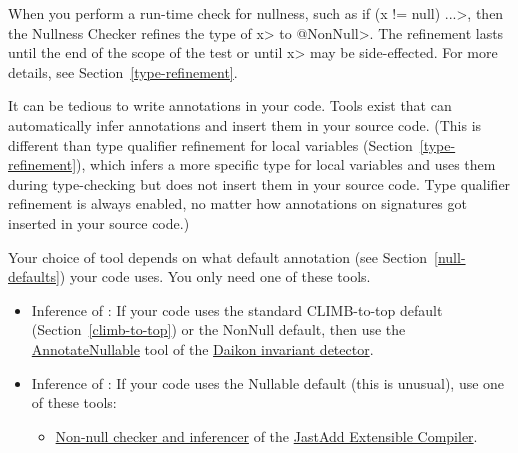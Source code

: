 
When you perform a run-time check for nullness, such as \<if (x != null)
...>, then the Nullness Checker refines the type of \<x> to
\<@NonNull>.  The refinement lasts until the end of the scope of the test
or until \<x> may be side-effected.  For more details, see
Section~\ref{type-refinement}.



It can be tedious to write annotations in your code.  Tools exist that
can automatically infer annotations and insert them in your source code.
(This is different than type qualifier refinement for local variables
(Section~\ref{type-refinement}), which infers a more specific type for
local variables and uses them during type-checking but does not insert them
in your source code.  Type qualifier refinement is always enabled, no
matter how annotations on signatures got inserted in your source code.)

Your choice of tool depends on what default annotation (see
Section~\ref{null-defaults}) your code uses.  You only need one of these tools.

\begin{itemize}

\item
  Inference of :
  If your code uses the standard CLIMB-to-top default (Section~\ref{climb-to-top}) or
  the NonNull default, then use the
  \href{https://plse.cs.washington.edu/daikon/download/doc/daikon.html#AnnotateNullable}{AnnotateNullable}
  tool of the \href{https://plse.cs.washington.edu/daikon/}{Daikon invariant
    detector}.

\item
  Inference of :
  If your code uses the Nullable default (this is unusual), use one of these tools:
\begin{itemize}
\item
  \href{https://jastadd.cs.lth.se/jastadd-tutorial-examples/non-null-types-for-java/}{Non-null
    checker and inferencer} of the \href{https://jastadd.cs.lth.se/}{JastAdd
    Extensible Compiler}.
\end{itemize}

\end{itemize}



